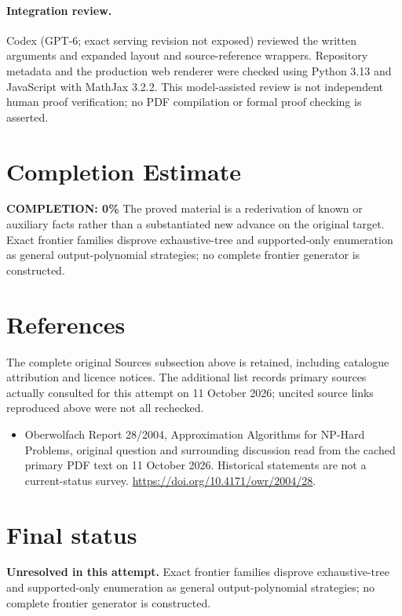 \documentclass[11pt]{article}
\begin{document}
\paragraph{Integration review.} Codex (GPT-6; exact serving revision not exposed) reviewed the written arguments and expanded layout and source-reference wrappers. Repository metadata and the production web renderer were checked using Python 3.13 and JavaScript with MathJax 3.2.2. This model-assisted review is not independent human proof verification; no PDF compilation or formal proof checking is asserted.

\section{Completion Estimate}
\noindent\textbf{COMPLETION: 0\%}
The proved material is a rederivation of known or auxiliary facts rather than a substantiated new advance on the original target. Exact frontier families disprove exhaustive-tree and supported-only enumeration as general output-polynomial strategies; no complete frontier generator is constructed.
\section{References}
The complete original Sources subsection above is retained, including catalogue attribution and licence notices. The additional list records primary sources actually consulted for this attempt on 11 October 2026; uncited source links reproduced above were not all rechecked.
\begin{itemize}
\item Oberwolfach Report 28/2004, Approximation Algorithms for NP-Hard Problems, original question and surrounding discussion read from the cached primary PDF text on 11 October 2026. Historical statements are not a current-status survey. \url{https://doi.org/10.4171/owr/2004/28}.
\end{itemize}
\section{Final status}
\textbf{Unresolved in this attempt.} Exact frontier families disprove exhaustive-tree and supported-only enumeration as general output-polynomial strategies; no complete frontier generator is constructed.
\end{document}

